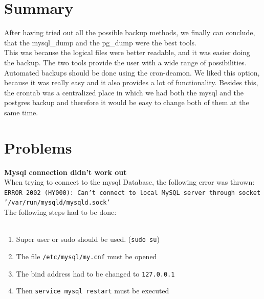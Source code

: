 \documentclass[10pt]{article}
\begin{document}
\section{Summary}
After having tried out all the possible backup methods, we finally can conclude, that the mysql\_dump and the pg\_dump were the best tools. \\ 
This was because the logical files were better readable, and it was easier doing the backup. The two tools provide the user with a wide range of possibilities. \\
Automated backups should be done using the cron-deamon. We liked this option, because it was really easy and it also provides a lot of functionality. Besides this, the crontab was a centralized place in which we had both the mysql and the postgres backup and therefore it would be easy to change both of them at the same time.

\section{Problems}
\textbf{Mysql connection didn't work out} \\
When trying to connect to the mysql Database, the following error was thrown:
\texttt{ERROR 2002 (HY000): Can't connect to local MySQL server through socket '/var/run/mysqld/mysqld.sock'} \\
The following steps had to be done: \\
\\ 
\begin{enumerate}
\item Super user or sudo should be used. (\texttt{sudo su}) 
\item The file \texttt{/etc/mysql/my.cnf} must be opened 
\item The bind address had to be changed to \texttt{127.0.0.1}
\item Then \texttt{service mysql restart} must be executed
\end{enumerate}
\cite{mysqlProblem1}
\end{document}
